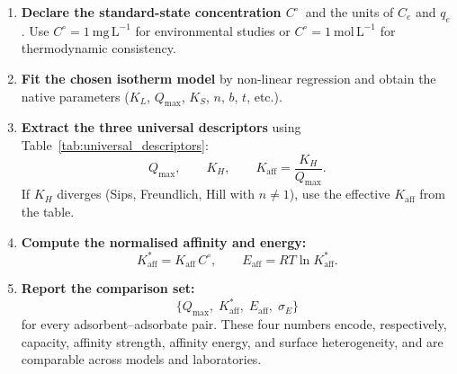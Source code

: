 	\begin{enumerate}
		\item \textbf{Declare the standard-state concentration
		$C^\circ$}~and the units of $C_e$ and $q_e$.
		Use $C^\circ = 1~\mathrm{mg\,L^{-1}}$ for environmental
		studies or $C^\circ = 1~\mathrm{mol\,L^{-1}}$ for
		thermodynamic consistency.

		\item \textbf{Fit the chosen isotherm model} by non-linear
		regression and obtain the native parameters
		($K_L$, $Q_{\max}$, $K_S$, $n$, $b$, $t$, etc.).

		\item \textbf{Extract the three universal descriptors}
		using Table~\ref{tab:universal_descriptors}:
		\begin{equation}
			Q_{\max},
			\qquad
			K_H,
			\qquad
			K_{\mathrm{aff}} = \frac{K_H}{Q_{\max}}.
			\label{eq:protocol_extract}
		\end{equation}
		If $K_H$ diverges (Sips, Freundlich, Hill with $n \neq 1$),
		use the effective $K_{\mathrm{aff}}$ from the table.

		\item \textbf{Compute the normalised affinity and energy:}
		\begin{equation}
			K_{\mathrm{aff}}^{\ast}
			= K_{\mathrm{aff}}\, C^\circ,
			\qquad
			E_{\mathrm{aff}} = RT\ln K_{\mathrm{aff}}^{\ast}.
		\end{equation}

		\item \textbf{Report the comparison set:}
		\begin{equation}
			\bigl\{
			Q_{\max},\;
			K_{\mathrm{aff}}^{\ast},\;
			E_{\mathrm{aff}},\;
			\sigma_E
			\bigr\}
			\label{eq:comparison_set}
		\end{equation}
		for every adsorbent--adsorbate pair.  These four numbers
		encode, respectively, capacity, affinity strength, affinity
		energy, and surface heterogeneity, and are comparable across
		models and laboratories.
	\end{enumerate}

